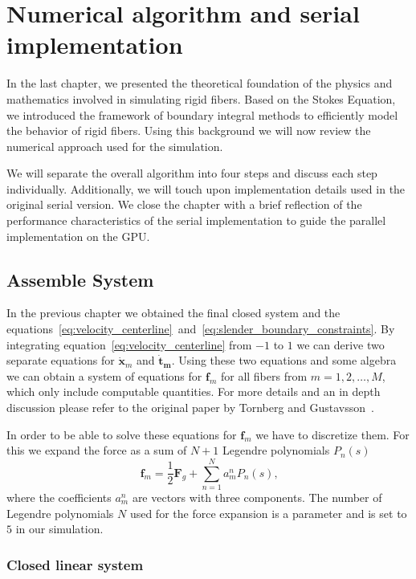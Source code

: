 \chapter{Numerical algorithm and serial implementation}
\label{cha:serial_implementation}

In the last chapter, we presented the theoretical foundation of the physics and mathematics involved in simulating rigid fibers. Based on the Stokes Equation, we introduced the framework of boundary integral methods to efficiently model the behavior of rigid fibers. Using this background we will now review the numerical approach used for the simulation.

We will separate the overall algorithm into four steps and discuss each step individually. Additionally, we will touch upon implementation details used in the original serial version. We close the chapter with a brief reflection of the performance characteristics of the serial implementation to guide the parallel implementation on the GPU.

\section{Assemble System}
In the previous chapter we obtained the final closed system and the equations~\eqref{eq:velocity_centerline}~and~\eqref{eq:slender_boundary_constraints}. By integrating equation~\eqref{eq:velocity_centerline} from $-1$ to $1$ we can derive two separate equations for $\mathbf{\dot{x}}_m$ and $\mathbf{\dot{t}_m}$. Using these two equations and some algebra we can obtain a system of equations for $\mathbf{f}_m$ for all fibers from $m=1,2,\dots,M$, which only include computable quantities. For more details and an in depth discussion please refer to the original paper by Tornberg and Gustavsson~\cite{Tornberg2006}.

In order to be able to solve these equations for $\mathbf{f}_m$ we have to discretize them. For this we expand the force as a sum of $N+1$ Legendre polynomials $P_n(s)$
\begin{equation}
  \label{eq:force_discretization}
  \mathbf{f}_m = \frac{1}{2}\mathbf{F}_g + \sum_{n=1}^{N}a_{m}^{n} P_n(s) \text{,}
\end{equation}
where the coefficients $a_{m}^{n}$ are vectors with three components. The number of Legendre polynomials $N$ used for the force expansion is a parameter and is set to $5$ in our simulation.

\subsection{Closed linear system}

